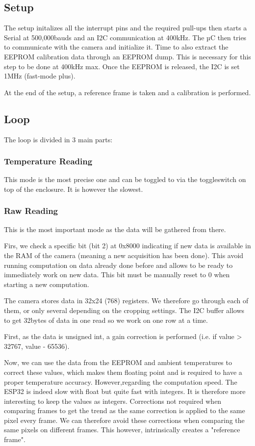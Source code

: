 \documentclass[a4paper]{article}
\begin{document}
\subsection{Setup}
The setup initalizes all the interrupt pins and the required pull-ups then starts a Serial at 500,000bauds and an I2C communication at 400kHz.
The µC then tries to communicate with the camera and initialize it. Time to also extract the EEPROM calibration data through an EEPROM dump. This is necessary for this step to be done at 400kHz max.
Once the EEPROM is released, the I2C is set 1MHz (fast-mode plus).

At the end of the setup, a reference frame is taken and a calibration is performed.

\subsection{Loop}
The loop is divided in 3 main parts:
\subsubsection{Temperature Reading}
This mode is the most precise one and can be toggled to via the toggleswitch on top of the enclosure. It is however the slowest.
\subsubsection{Raw Reading}
This is the most important mode as the data will be gathered from there. 

Firs, we check a specific bit (bit 2) at 0x8000 indicating if new data is available in the RAM of the camera (meaning a new acquisition has been done).
This avoid running computation on data already done before and allows to be ready to immediately work on new data.
This bit must be manually reset to 0 when starting a new computation.

The camera stores data in 32x24 (768) registers. We therefore go through each of them, or only several depending on the cropping settings. The I2C buffer allows to get 32bytes of data in one read so we work on one row at a time.

First, as the data is unsigned int, a gain correction is performed (i.e. if value > 32767, value - 65536).

Now, we can use the data from the EEPROM and ambient temperatures to correct these values, which makes them floating point and is required to have a proper temperature accuracy. However,regarding the computation speed. The ESP32 is indeed slow with float but quite fast with integers. It is therefore more interesting to keep the values as integers. Corrections not required when comparing frames to get the trend as the same correction is applied to the same pixel every frame. We can therefore avoid these corrections when comparing the same pixels on different frames. This however, intrinsically creates a "reference frame".
\end{document}

